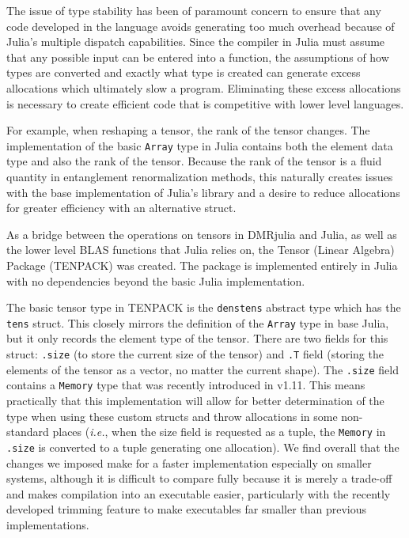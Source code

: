 \documentclass{juliacon}
\begin{document}
The issue of type stability has been of paramount concern to ensure that any code developed in the language avoids generating too much overhead because of Julia's multiple dispatch capabilities. Since the compiler in Julia must assume that any possible input can be entered into a function, the assumptions of how types are converted and exactly what type is created can generate excess allocations which ultimately slow a program. Eliminating these excess allocations is necessary to create efficient code that is competitive with lower level languages.

For example, when reshaping a tensor, the rank of the tensor changes. The implementation of the basic {\tt Array} type in Julia contains both the element data type and also the rank of the tensor. Because the rank of the tensor is a fluid quantity in entanglement renormalization methods, this naturally creates issues with the base implementation of Julia's library and a desire to reduce allocations for greater efficiency with an alternative struct.

As a bridge between the operations on tensors in DMRjulia and Julia, as well as the lower level BLAS functions that Julia relies on, the Tensor (Linear Algebra) Package (TENPACK) was created. The package is implemented entirely in Julia with no dependencies beyond the basic Julia implementation.

The basic tensor type in TENPACK is the {\tt denstens} abstract type which has the {\tt tens} struct. This closely mirrors the definition of the {\tt Array} type in base Julia, but it only records the element type of the tensor. There are two fields for this struct: {\tt .size} (to store the current size of the tensor) and {\tt .T} field (storing the elements of the tensor as a vector, no matter the current shape). The {\tt .size} field contains a {\tt Memory} type that was recently introduced in v1.11. This means practically that this implementation will allow for better determination of the type when using these custom structs and throw allocations in some non-standard places ({\it i.e.}, when the size field is requested as a tuple, the {\tt Memory} in {\tt .size} is converted to a tuple generating one allocation). We find overall that the changes we imposed make for a faster implementation especially on smaller systems, although it is difficult to compare fully because it is merely a trade-off and makes compilation into an executable easier, particularly with the recently developed trimming feature to make executables far smaller than previous implementations.
\end{document}
